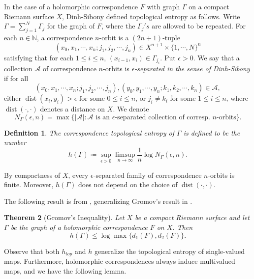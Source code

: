 \documentclass[11pt,letterpaper]{article}
\newtheorem{theorem}{Theorem}[section]
\newtheorem{definition}[theorem]{Definition}
\theoremstyle{definition}
\begin{document}
In the case of a holomorphic correspondence $F$ with graph $\Gamma$ on a compact Riemann surface $X$, Dinh-Sibony \cite{DinSib08II} defined topological entropy as follows. Write $\Gamma=\sum_{j=1}^N\Gamma_j$ for the graph of $F$, where the $\Gamma_j 's$ are allowed to be repeated. For each $n\in\mathbb{N}$, a correspondence $n$-orbit is a $(2n+1)$-tuple
$$(x_0,x_1,\cdots,x_n;j_1,j_2,\cdots,j_n)\in X^{n+1}\times\lbrace 1,\cdots,N\rbrace^n$$
satisfying that for each $1\leq i\leq n$, $(x_{i-1},x_{i})\in\Gamma_{j_i}$. Put $\epsilon >0$. We say that a collection $\mathcal{A}$ of correspondence $n$-orbits is \emph{$\epsilon$-separated in the sense of Dinh-Sibony} if for all 
$$(x_0,x_1,\cdots,x_n;j_1,j_2,\cdots,j_n), (y_0,y_1,\cdots,y_n;k_1,k_2,\cdots,k_n)\in\mathcal{A},$$
either $\operatorname{dist}(x_i,y_i)>\epsilon\mbox{ for some }0\leq i\leq n$, or $j_i\neq k_i$ for some $1\leq i\leq n$, where $\operatorname{dist}(\cdot,\cdot)$ denotes a distance on $X$. We denote $$N_{\Gamma}(\epsilon,n)=\max\lbrace|\mathcal{A}|: \mathcal{A}\mbox{ is an }\epsilon\mbox{-separated collection of corresp. } n\mbox{-orbits}\rbrace.$$

\begin{definition} The \emph{correspondence topological entropy} of $\Gamma$ is defined to be the number
$$h(\Gamma)\coloneqq\sup\limits_{\epsilon >0}\limsup\limits_{n\to\infty}\frac{1}{n}\log N_{\Gamma}(\epsilon,n).$$
\end{definition}

By compactness of $X$, every $\epsilon$-separated family of correspondence $n$-orbits is finite. Moreover, $h(\Gamma)$ does not depend on the choice of $\operatorname{dist}(\cdot,\cdot)$.


The following result is from \cite{DinSib08II}, generalizing Gromov's result in \cite{Gro03}.

\begin{theorem}[Gromov's Inequality]\label{bound} %
Let $X$ be a compact Riemann surface and let $\Gamma$ be the graph of a holomorphic correspondence $F$ on $X$. Then
$$h(\Gamma)\leq\log\max\lbrace d_1(F),d_2(F)\rbrace.$$
\end{theorem}


Observe that both $h_{top}$ and $h$ generalize the topological entropy of single-valued maps. Furthermore, holomorphic correspondences always induce multivalued maps, and we have the following lemma.
\end{document}
